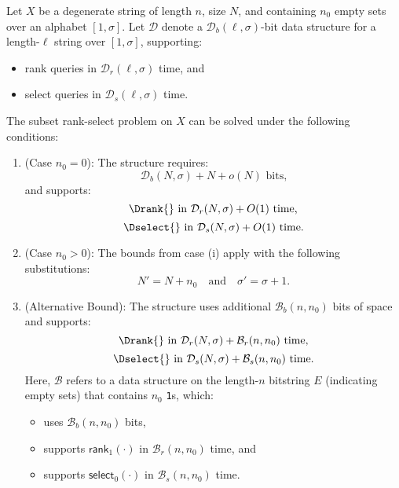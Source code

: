 \begin{theorem}
    \label{thm:general_upper_bound}
    Let $X$ be a degenerate string of length $n$, size $N$, and containing $n_0$ empty sets over an alphabet $[1, \sigma]$. Let $\mathcal{D}$ denote a $\mathcal{D}_b(\ell, \sigma)$-bit data structure for a length-$\ell$ string over $[1, \sigma]$, supporting:
    \begin{itemize}
        \item \textsf{rank} queries in $\mathcal{D}_r(\ell, \sigma)$ time, and
        \item \textsf{select} queries in $\mathcal{D}_s(\ell, \sigma)$ time.
    \end{itemize}
    The subset rank-select problem on $X$ can be solved under the following conditions:

    \begin{enumerate}[label=(\roman*)]
        \item (Case $n_0 = 0$):
              The structure requires:
              \[
                  \mathcal{D}_b(N, \sigma) + N + o(N) \text{ bits,}
              \]
              and supports:
              \[
                  \Drank{} \text{ in } \mathcal{D}_r(N, \sigma) + O(1) \text{ time,}
              \]
              \[
                  \Dselect{} \text{ in } \mathcal{D}_s(N, \sigma) + O(1) \text{ time.}
              \]

        \item (Case $n_0 > 0$):
              The bounds from case (i) apply with the following substitutions:
              \[
                  N' = N + n_0 \quad \text{and} \quad \sigma' = \sigma + 1.
              \]

        \item (Alternative Bound):
              The structure uses additional $\mathcal{B}_b(n, n_0)$ bits of space and supports:
              \[
                  \Drank{} \text{ in } \mathcal{D}_r(N, \sigma) + \mathcal{B}_r(n, n_0) \text{ time,}
              \]
              \[
                  \Dselect{} \text{ in } \mathcal{D}_s(N, \sigma) + \mathcal{B}_s(n, n_0) \text{ time.}
              \]
              Here, $\mathcal{B}$ refers to a data structure on the length-$n$ bitstring $E$ (indicating empty sets) that contains $n_0$ \texttt{1}s, which:
              \begin{itemize}
                  \item uses $\mathcal{B}_b(n, n_0)$ bits,
                  \item supports $\textsf{rank}_1(\cdot)$ in $\mathcal{B}_r(n, n_0)$ time, and
                  \item supports $\textsf{select}_0(\cdot)$ in $\mathcal{B}_s(n, n_0)$ time.
              \end{itemize}
    \end{enumerate}
\end{theorem}

